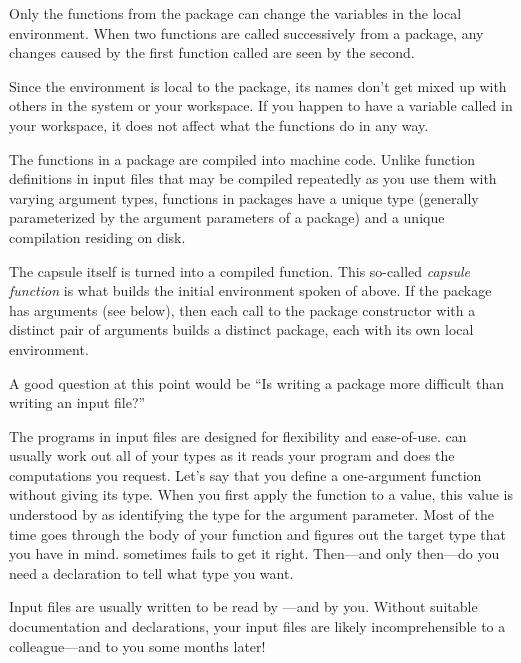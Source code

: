 Only the functions from the package can change the variables in the local
environment.
When two functions are called successively from a package,
any changes caused by the first function called
are seen by the second.

Since the environment is local to the package, its names
don't get mixed
up with others in the system or your workspace.
If you happen to have a variable called  in your
workspace, it does not affect what the
 functions do in any way.

The functions in a package are compiled into machine code.
Unlike function definitions in input files that may be compiled repeatedly
as you use them with varying argument types,
functions in packages have a unique type (generally parameterized by
the argument parameters of a package) and a unique compilation residing on disk.

The capsule itself is turned into a compiled function.
This so-called {\it capsule function} is what builds the initial environment
spoken of above.
If the package has arguments (see below), then each call to the package
constructor with a distinct pair of arguments
builds a distinct package, each with its own local environment.

%
A good question at this point would be ``Is writing a package more difficult than
writing an input file?''

The programs in input files are designed for flexibility and ease-of-use.
\Language{} can usually work out all of your types as it reads your program
and does the computations you request.
Let's say that you define a one-argument function without giving its type.
When you first apply the function to a value, this
value is understood by \Language{} as identifying the type for the
argument parameter.
Most of the time \Language{} goes through the body of your function and
figures out the target type that you have in mind.
\Language{} sometimes fails to get it right.
Then---and only then---do you need a declaration to tell \Language{} what
type you want.

Input files are usually written to be read by \Language{}---and by you.
Without suitable documentation and declarations, your input files
are likely incomprehensible to a colleague---and to you some
months later!

